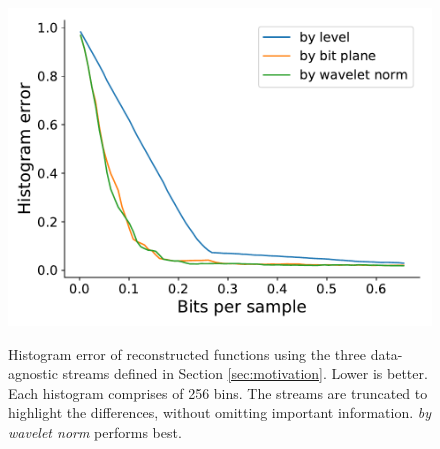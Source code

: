 \begin{figure}[h]
 	{\includegraphics[width=0.48\linewidth]{img/motivation/motivation-histogram-velocityz.pdf}}
 	\caption{Histogram error of reconstructed functions using the three data-agnostic streams defined
 	in Section \ref{sec:motivation}. Lower is better. Each histogram comprises of 256 bins. The
 	streams are truncated to highlight the differences, without omitting important information.
 	\emph{by wavelet norm} performs best.}
 	\label{fig:motivation-histogram}
\end{figure}

